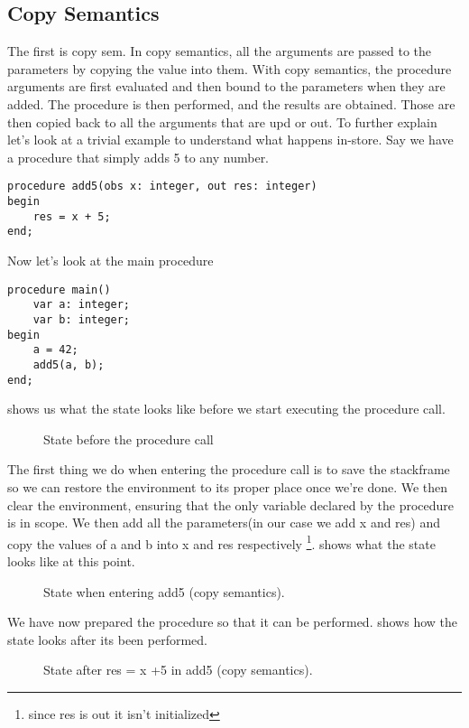     \subsection{Copy Semantics}
        The first is \gls{copy sem}. 
        In copy semantics, all the arguments are passed to the parameters by copying the value into them.
        With copy semantics, the procedure arguments are first evaluated and then bound to the parameters when they are added.
        The procedure is then performed, and the results are obtained. Those are then copied back to all the arguments that are upd or out.
        To further explain let's look at a trivial example to understand what happens in-store.
        Say we have a procedure that simply adds 5 to any number.
\begin{lstlisting}
procedure add5(obs x: integer, out res: integer)
begin
    res = x + 5;
end;

\end{lstlisting}
        Now let's look at the main procedure
\begin{lstlisting}
procedure main()
    var a: integer;
    var b: integer;
begin
    a = 42;
    add5(a, b);
end;
\end{lstlisting}
 shows us what the state looks like before we start executing the procedure call.
\begin{figure}[!h]
    \caption{State before the procedure call}
    \label{fig:mainBeforeCall}
\end{figure}
The first thing we do when entering the procedure call is to save the stackframe so we can restore the environment to its proper place once we're done. We then clear the environment, ensuring that the only variable declared by the procedure is in scope.
We then add all the parameters(in our case we add x and res) and copy the values of a and b into x and res respectively \footnote{since res is out it isn't initialized}.
 shows what the state looks like at this point.

\begin{figure}[!h]
    \caption{State when entering add5 (copy semantics).}
    \label{fig:mainBeginCallCopy}
\end{figure}     

We have now prepared the procedure so that it can be performed.
 shows how the state looks after its been performed.
\begin{figure}[!h]
    \caption{State after res = x +5 in add5 (copy semantics).}
    \label{fig:mainEndCallCopy}
\end{figure}


